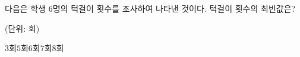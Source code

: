 다음은 학생 $6$명의 턱걸이 횟수를 조사하여 나타낸 것이다. 턱걸이 횟수의 최빈값은?\par\noindent\hfill{\footnotesize (단위: 회)}
\begin{choices32}{$3$회}{$5$회}{$6$회}{$7$회}{$8$회}\end{choices32}
